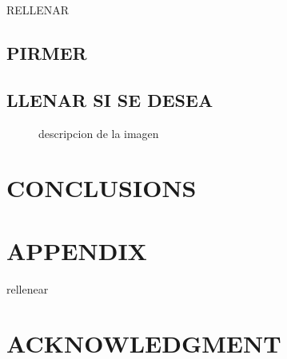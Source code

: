 \documentclass[journal]{IEEEtran}
\begin{document}
RELLENAR 

\subsection{PIRMER}



\subsection{LLENAR SI SE DESEA}



   \begin{figure}[thpb]
      \centering
      \caption{descripcion de la imagen }
      \label{figurelabel}
   \end{figure}
   


\section{CONCLUSIONS}



\addtolength{\textheight}{-12cm}




\section*{APPENDIX}

rellenear

\section*{ACKNOWLEDGMENT}

\begin{thebibliography}{99}



\end{thebibliography}
\end{document}
